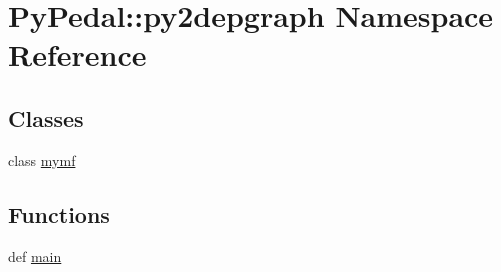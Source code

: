 \hypertarget{namespacePyPedal_1_1py2depgraph}{
\section{PyPedal::py2depgraph Namespace Reference}
\label{namespacePyPedal_1_1py2depgraph}
}


\subsection*{Classes}
\begin{CompactItemize}
\item 
class \hyperlink{classPyPedal_1_1py2depgraph_1_1mymf}{mymf}
\end{CompactItemize}
\subsection*{Functions}
\begin{CompactItemize}
\item 
\hypertarget{namespacePyPedal_1_1py2depgraph_52c01ccc4f5513209d224b68b9fe635c}{
def \hyperlink{namespacePyPedal_1_1py2depgraph_52c01ccc4f5513209d224b68b9fe635c}{main}}
\label{namespacePyPedal_1_1py2depgraph_52c01ccc4f5513209d224b68b9fe635c}

\end{CompactItemize}
